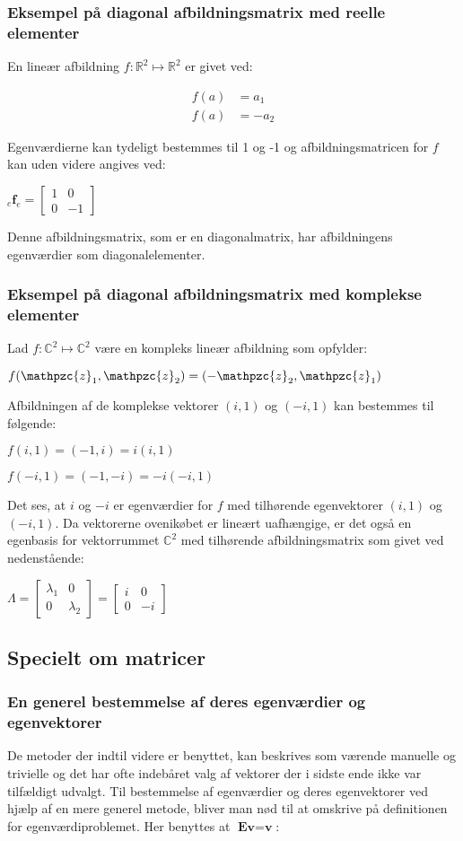 \documentclass{article}
\newcommand{\cent}[1]{\begin{center}#1\end{center}}
\newcommand{\mAlign}[1]{\begin{align*}#1\end{align*}}
\newcommand{\afb}[3]{\ensuremath{_#1 \textbf{#2}_#3}}
\newcommand{\smallMatrix}[4]{\ensuremath{\begin{bmatrix}
			#1 & #2 \\
			#3 & #4
\end{bmatrix}}}
\newcommand{\script}[1]{\mathpzc{#1}}
\begin{document}
	\subsubsection{Eksempel på diagonal afbildningsmatrix med reelle elementer}
	
	En lineær afbildning $ f : \mathbb{R}^2 \mapsto \mathbb{R}^2 $ er givet ved:
	
	\mAlign{f(a)&=a_1 \\ f(a)&=-a_2}
	
	Egenværdierne kan tydeligt bestemmes til 1 og -1 og afbildningsmatricen for $ f $ kan uden videre angives ved:
	
	\cent{ $ \afb{e}{f}{e} = \smallMatrix{1}{0}{0}{-1}$}
	
	Denne afbildningsmatrix, som er en diagonalmatrix, har afbildningens egenværdier som diagonalelementer.
	
	\subsubsection*{Eksempel på diagonal afbildningsmatrix med komplekse elementer}
	Lad $ f : \mathbb{C}^2 \mapsto \mathbb{C}^2 $ være en kompleks lineær afbildning som opfylder:
	\cent{$ f(\script{z}_1,\script{z}_2) = (-\script{z}_2,\script{z}_1) $}
	
	Afbildningen af de komplekse vektorer $(i,1)$ og $(-i,1)$ kan bestemmes til følgende:
	
	\cent{$ f(i,1)=(-1,i)=i(i,1) $}
	\cent{$ f(-i,1)=(-1,-i)=-i(-i,1) $}
	
	Det ses, at $i$ og $-i$ er egenværdier for $f$ med tilhørende egenvektorer $(i,1)$ og $(-i,1)$.  Da vektorerne ovenikøbet er lineært uafhængige, er det også en egenbasis for vektorrummet $\mathbb{C}^2$ med tilhørende afbildningsmatrix som givet ved nedenstående:
	
	\cent{$ \Lambda = \smallMatrix{\lambda_1}{0}{0}{\lambda_2} = \smallMatrix{i}{0}{0}{-i} $}
	
	
	
	\subsection{Specielt om matricer}
	\subsubsection{En generel bestemmelse af deres egenværdier og egenvektorer}
	
	De metoder der indtil videre er benyttet, kan beskrives som værende manuelle og trivielle og det har ofte indebåret valg af vektorer der i sidste ende ikke var tilfældigt udvalgt. Til bestemmelse af egenværdier og deres egenvektorer ved hjælp af en mere generel metode, bliver man nød til at omskrive på definitionen for egenværdiproblemet. Her benyttes at $ \textbf{Ev}=\textbf{v} $:
	
\end{document}
